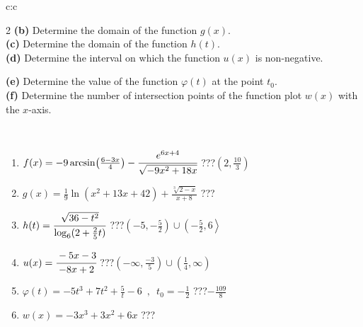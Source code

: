 \documentclass[10pt]{report}
\begin{document}
\begin{tabular}{c:c}
\begin{minipage}[c][104.5mm][t]{0.5\linewidth}
\begin{center}
\begin{minipage}{0.95\linewidth}
\begin{center}
{\begin{multicols}{2}
\textbf{(b)} Determine the domain of the function \(g(x)\). \\[1mm]
\textbf{(c)} Determine the domain of the function \(h(t)\). \\[1mm]
\textbf{(d)} Determine the interval on which the function \(u(x)\) is non-negative. \par \columnbreak
\textbf{(e)} Determine the value of the function \(\varphi(t)\) at the point \(t_0\). \\[1mm]
\textbf{(f)} Determine the number of intersection points of the function plot \(w(x)\) with the \(x\)-axis. \\[1mm]
\end{multicols}
}
\end{center}
\end{minipage}
\\[4mm]
\begin{minipage}{0.79\linewidth}
\begin{center}
\begin{varwidth}{\linewidth}
\begin{enumerate}
\small
\item $f(x) = -9\arcsin\!\left( \frac{6-3x}{4} \right) - \cfrac{e^{6x+4}}{\sqrt{-9x^2+18x}}$\quad \dotfill\; ???\;\dotfill \quad $\left(2 , \frac{10}{3}\right)$
\item $g(x) = \frac{1}{9} \ln{\!(x^2+13x+42)}+\frac{\sqrt[3]{2-x}}{x+8}$\quad \dotfill\; ???\;\dotfill {}
\item $h(t) = \cfrac{\sqrt{36-t^2}}{\log_6(2+\frac{2}{5}t)}$\quad \dotfill\; ???\;\dotfill \quad $\left(-5 , -\frac{5}{2}\right)\cup\left(-\frac{5}{2} , 6\right\rangle$
\item $u(x) = \cfrac{-5x-3}{-8x+2}$\quad \dotfill\; ???\;\dotfill \quad $\left(-\infty , \frac{-3}{5}\right)\cup\left(\frac{1}{4} , \infty\right)$
\item $\varphi(t) = -5t^3+7t^2+\frac{5}{t}-6 \enspace , \enspace t_0=-\frac{1}{2}$\quad \dotfill\; ???\;\dotfill \quad $-\frac{109}{8}$
\item $w(x) = -3x^3+3x^2+6x$\quad \dotfill\; ???\;\dotfill {}
\end{enumerate}
\end{varwidth}
\end{center}
\end{minipage}
\begin{minipage}{0.20\linewidth}
\begin{center}

\end{center}
\end{minipage}
\end{center}
\end{minipage}
\end{tabular}
\end{document}
